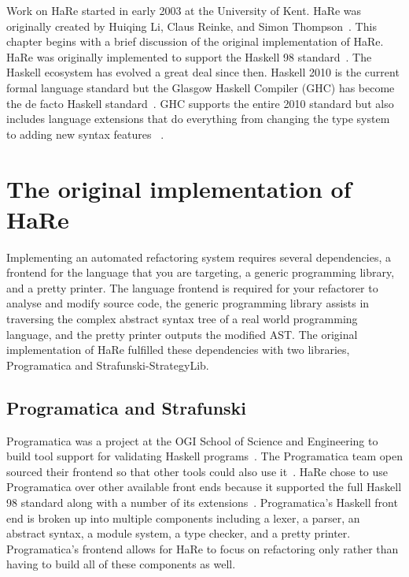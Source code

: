 
Work on HaRe started in early 2003 at the University of Kent. HaRe was originally created by Huiqing Li, Claus Reinke, and Simon Thompson~\citep{refacWebsite}. This chapter begins with a brief discussion of the original implementation of HaRe. HaRe was originally implemented to support the Haskell 98 standard~\citep{huiqingThesis}. The Haskell ecosystem has evolved a great deal since then. Haskell 2010 is the current formal language standard but the Glasgow Haskell Compiler (GHC) has become the de facto Haskell standard~\citep{refacTools}. GHC supports the entire 2010 standard but also includes language extensions that do everything from changing the type system to adding new syntax features~ \cite{langExts}.



\section{The original implementation of HaRe}

Implementing an automated refactoring system requires several dependencies, a frontend for the language that you are targeting, a generic programming library, and a pretty printer. The language frontend is required for your refactorer to analyse and modify source code, the generic programming library assists in traversing the complex abstract syntax tree of a real world programming language, and the pretty printer outputs the modified AST. The original implementation of HaRe fulfilled these dependencies with two libraries, Programatica and Strafunski-StrategyLib. 

\subsection{Programatica and Strafunski}\label{prog&Strafunski}

Programatica was a project at the OGI School of Science and Engineering to build tool support for validating Haskell programs~\cite{programaticaTools}. The Programatica team open sourced their frontend so that other tools could also use it~\citep{refacWebsite}. HaRe chose to use Programatica over other available front ends because it supported the full Haskell 98 standard along with a number of its extensions~\citep{huiqingThesis}. Programatica's Haskell front end is broken up into multiple components including a lexer, a parser, an abstract syntax, a module system, a type checker, and a pretty printer. Programatica's frontend allows for HaRe to focus on refactoring only rather than having to build all of these components as well.

